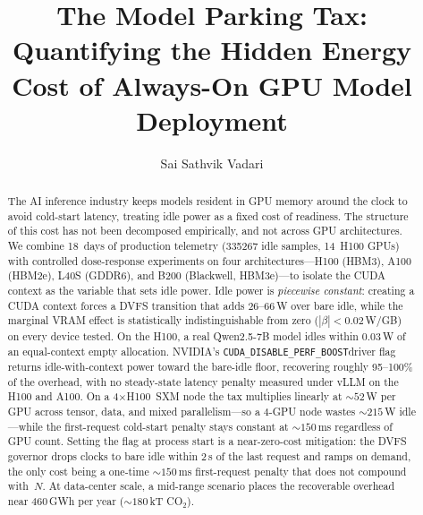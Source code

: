 \documentclass[sigconf,nonacm]{acmart}
\newcommand{\perfboost}{\texttt{CUDA\_\hspace{0pt}DISABLE\_\hspace{0pt}PERF\_\hspace{0pt}BOOST}}
\begin{document}
\title{The Model Parking Tax: Quantifying the Hidden Energy Cost of Always-On GPU Model Deployment}

\author{Sai Sathvik Vadari}

\begin{abstract}
The AI inference industry keeps models resident in GPU memory around the clock to avoid cold-start latency, treating idle power as a fixed cost of readiness. The structure of this cost has not been decomposed empirically, and not across GPU architectures. We combine 18~days of production telemetry (\num{335267} idle samples, 14~H100 GPUs) with controlled dose-response experiments on four architectures---H100 (HBM3), A100 (HBM2e), L40S (GDDR6), and B200 (Blackwell, HBM3e)---to isolate the CUDA context as the variable that sets idle power. Idle power is \emph{piecewise constant}: creating a CUDA context forces a DVFS transition that adds $26$--$66$\,W over bare idle, while the marginal VRAM effect is statistically indistinguishable from zero ($|\beta| < 0.02$\,W/GB) on every device tested. On the H100, a real Qwen2.5-7B model idles within 0.03\,W of an equal-context empty allocation. NVIDIA's \perfboost driver flag returns idle-with-context power toward the bare-idle floor, recovering roughly 95--100\% of the overhead, with no steady-state latency penalty measured under vLLM on the H100 and A100. On a 4$\times$H100~SXM node the tax multiplies linearly at ${\sim}52$\,W per GPU across tensor, data, and mixed parallelism---so a 4-GPU node wastes ${\sim}215$\,W idle---while the first-request cold-start penalty stays constant at ${\sim}150$\,ms regardless of GPU count. Setting the flag at process start is a near-zero-cost mitigation: the DVFS governor drops clocks to bare idle within 2\,s of the last request and ramps on demand, the only cost being a one-time ${\sim}150$\,ms first-request penalty that does not compound with~$N$. At data-center scale, a mid-range scenario places the recoverable overhead near \num{460}\,GWh per year (${\sim}180$\,kT CO$_2$).
\end{abstract}


\maketitle

\end{document}

